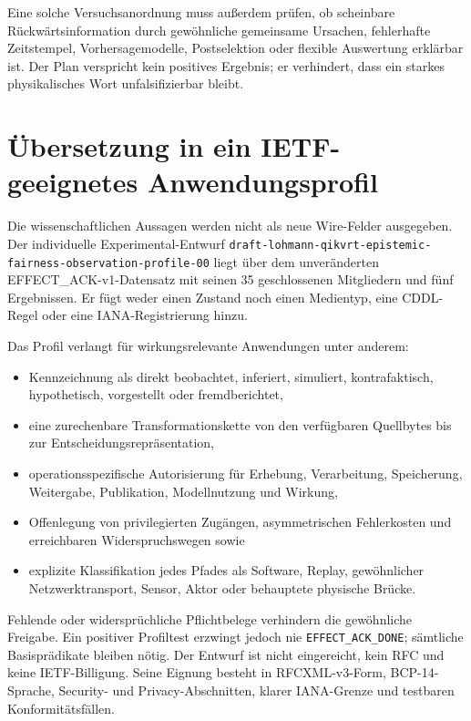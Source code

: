 \documentclass[11pt,a4paper]{article}
\theoremstyle{remark}
\newcommand{\DONE}{\texttt{EFFECT\_ACK\_DONE}}
\begin{document}
Eine solche Versuchsanordnung muss außerdem prüfen, ob scheinbare
Rückwärtsinformation durch gewöhnliche gemeinsame Ursachen, fehlerhafte
Zeitstempel, Vorhersagemodelle, Postselektion oder flexible Auswertung
erklärbar ist. Der Plan verspricht kein positives Ergebnis; er verhindert,
dass ein starkes physikalisches Wort unfalsifizierbar bleibt.

\section{Übersetzung in ein IETF-geeignetes Anwendungsprofil}

Die wissenschaftlichen Aussagen werden nicht als neue Wire-Felder
ausgegeben. Der individuelle Experimental-Entwurf
\texttt{draft-lohmann-qikvrt-epistemic-fairness-observation-profile-00}
liegt über dem unveränderten EFFECT\_ACK-v1-Datensatz mit seinen 35
geschlossenen Mitgliedern und fünf Ergebnissen. Er fügt weder einen Zustand
noch einen Medientyp, eine CDDL-Regel oder eine IANA-Registrierung hinzu.

Das Profil verlangt für wirkungsrelevante Anwendungen unter anderem:

\begin{itemize}
  \item Kennzeichnung als direkt beobachtet, inferiert, simuliert,
    kontrafaktisch, hypothetisch, vorgestellt oder fremdberichtet,
  \item eine zurechenbare Transformationskette von den verfügbaren
    Quellbytes bis zur Entscheidungsrepräsentation,
  \item operationsspezifische Autorisierung für Erhebung, Verarbeitung,
    Speicherung, Weitergabe, Publikation, Modellnutzung und Wirkung,
  \item Offenlegung von privilegierten Zugängen, asymmetrischen Fehlerkosten
    und erreichbaren Widerspruchswegen sowie
  \item explizite Klassifikation jedes Pfades als Software, Replay,
    gewöhnlicher Netzwerktransport, Sensor, Aktor oder behauptete physische
    Brücke.
\end{itemize}

Fehlende oder widersprüchliche Pflichtbelege verhindern die gewöhnliche
Freigabe. Ein positiver Profiltest erzwingt jedoch nie \DONE; sämtliche
Basisprädikate bleiben nötig. Der Entwurf ist nicht eingereicht, kein RFC und
keine IETF-Billigung. Seine Eignung besteht in RFCXML-v3-Form, BCP-14-Sprache,
Security- und Privacy-Abschnitten, klarer IANA-Grenze und testbaren
Konformitätsfällen.
\end{document}

